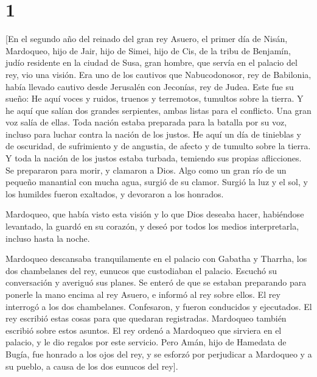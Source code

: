 \hypertarget{section}{%
\section{1}\label{section}}

 {[}En el segundo año del reinado del gran rey Asuero, el
primer día de Nisán, Mardoqueo, hijo de Jair, hijo de Simei, hijo de
Cis, de la tribu de Benjamín, judío residente en la ciudad de Susa, gran
hombre, que servía en el palacio del rey, vio una visión. Era uno de los
cautivos que Nabucodonosor, rey de Babilonia, había llevado cautivo
desde Jerusalén con Jeconías, rey de Judea. Este fue su sueño: He aquí
voces y ruidos, truenos y terremotos, tumultos sobre la tierra. Y he
aquí que salían dos grandes serpientes, ambas listas para el conflicto.
Una gran voz salía de ellas. Toda nación estaba preparada para la
batalla por su voz, incluso para luchar contra la nación de los justos.
He aquí un día de tinieblas y de oscuridad, de sufrimiento y de
angustia, de afecto y de tumulto sobre la tierra. Y toda la nación de
los justos estaba turbada, temiendo sus propias aflicciones. Se
prepararon para morir, y clamaron a Dios. Algo como un gran río de un
pequeño manantial con mucha agua, surgió de su clamor. Surgió la luz y
el sol, y los humildes fueron exaltados, y devoraron a los honrados.

Mardoqueo, que había visto esta visión y lo que Dios deseaba hacer,
habiéndose levantado, la guardó en su corazón, y deseó por todos los
medios interpretarla, incluso hasta la noche.

Mardoqueo descansaba tranquilamente en el palacio con Gabatha y Tharrha,
los dos chambelanes del rey, eunucos que custodiaban el palacio. Escuchó
su conversación y averiguó sus planes. Se enteró de que se estaban
preparando para ponerle la mano encima al rey Asuero, e informó al rey
sobre ellos. El rey interrogó a los dos chambelanes. Confesaron, y
fueron conducidos y ejecutados. El rey escribió estas cosas para que
quedaran registradas. Mardoqueo también escribió sobre estos asuntos. El
rey ordenó a Mardoqueo que sirviera en el palacio, y le dio regalos por
este servicio. Pero Amán, hijo de Hamedata de Bugía, fue honrado a los
ojos del rey, y se esforzó por perjudicar a Mardoqueo y a su pueblo, a
causa de los dos eunucos del rey{]}.

